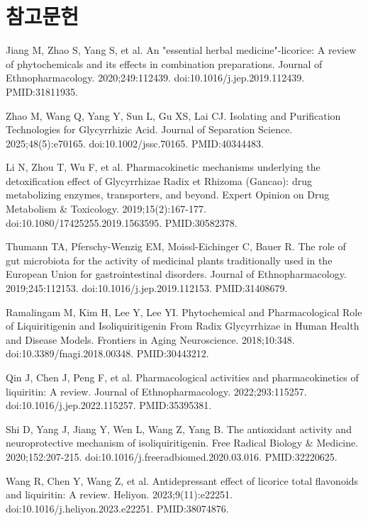 \documentclass[12pt,oneside]{book}
\newcommand{\refstart}{\par\begingroup\fontsize{8.5pt}{10.2pt}\selectfont\setlength{\parskip}{1.4pt}\raggedright}
\newcommand{\reff}[2]{\par\hangindent=7mm\hangafter=1\noindent[#1]\hspace{2mm}#2\par}
\begin{document}
\section*{참고문헌}

\refstart

\reff{1}{Jiang M, Zhao S, Yang S, et al. An "essential herbal medicine"-licorice: A review of phytochemicals and its effects in combination preparations. Journal of Ethnopharmacology. 2020;249:112439. doi:10.1016/j.jep.2019.112439. PMID:31811935.}

\reff{2}{Zhao M, Wang Q, Yang Y, Sun L, Gu XS, Lai CJ. Isolating and Purification Technologies for Glycyrrhizic Acid. Journal of Separation Science. 2025;48(5):e70165. doi:10.1002/jssc.70165. PMID:40344483.}

\reff{3}{Li N, Zhou T, Wu F, et al. Pharmacokinetic mechanisms underlying the detoxification effect of Glycyrrhizae Radix et Rhizoma (Gancao): drug metabolizing enzymes, transporters, and beyond. Expert Opinion on Drug Metabolism \& Toxicology. 2019;15(2):167-177. doi:10.1080/17425255.2019.1563595. PMID:30582378.}

\reff{4}{Thumann TA, Pferschy-Wenzig EM, Moissl-Eichinger C, Bauer R. The role of gut microbiota for the activity of medicinal plants traditionally used in the European Union for gastrointestinal disorders. Journal of Ethnopharmacology. 2019;245:112153. doi:10.1016/j.jep.2019.112153. PMID:31408679.}

\reff{5}{Ramalingam M, Kim H, Lee Y, Lee YI. Phytochemical and Pharmacological Role of Liquiritigenin and Isoliquiritigenin From Radix Glycyrrhizae in Human Health and Disease Models. Frontiers in Aging Neuroscience. 2018;10:348. doi:10.3389/fnagi.2018.00348. PMID:30443212.}

\reff{6}{Qin J, Chen J, Peng F, et al. Pharmacological activities and pharmacokinetics of liquiritin: A review. Journal of Ethnopharmacology. 2022;293:115257. doi:10.1016/j.jep.2022.115257. PMID:35395381.}

\reff{7}{Shi D, Yang J, Jiang Y, Wen L, Wang Z, Yang B. The antioxidant activity and neuroprotective mechanism of isoliquiritigenin. Free Radical Biology \& Medicine. 2020;152:207-215. doi:10.1016/j.freeradbiomed.2020.03.016. PMID:32220625.}

\reff{8}{Wang R, Chen Y, Wang Z, et al. Antidepressant effect of licorice total flavonoids and liquiritin: A review. Heliyon. 2023;9(11):e22251. doi:10.1016/j.heliyon.2023.e22251. PMID:38074876.}
\end{document}
